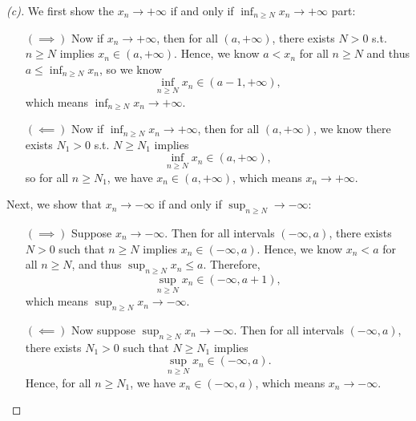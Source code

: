 \begin{proof}[(c)]
  We first show the \(x_n \to +\infty \) if and only if \(\inf _{n \ge N} x_n \to +\infty \) part: 
  \begin{itemize}
    \item [\((\implies )\)] Now if \(x_n \to +\infty \), then for all \((a, +\infty )\), there exists \(N > 0\) s.t. \(n \ge N\) implies \(x_n \in (a, +\infty )\). Hence, we know \(a < x_n\) for all \(n \ge N\) and thus \(a \le \inf _{n \ge N} x_n\), so we know \[\inf _{n \ge N}x_n \in (a - 1, +\infty ),\] which means \(\inf _{n \ge N} x_n \to +\infty \).          
    \item [\((\impliedby )\)] Now if \(\inf _{n \ge N} x_n \to +\infty \), then for all \((a, +\infty )\), we know there exists \(N_1 > 0\) s.t. \(N \ge N_1\) implies 
    \[
      \inf _{n \ge N} x_n \in (a, +\infty ),
    \] so for all \(n \ge N_1\), we have \(x_n \in (a, +\infty )\), which means \(x_n \to +\infty \).   
  \end{itemize}
  Next, we show that \(x_n \to -\infty \) if and only if \(\sup _{n \ge N} \to -\infty \):
  
\begin{itemize}
  \item [\((\implies)\)] 
  Suppose \(x_n \to -\infty\).  
  Then for all intervals \((-\infty, a)\), there exists \(N > 0\) such that \(n \ge N\) implies \(x_n \in (-\infty, a)\).  
  Hence, we know \(x_n < a\) for all \(n \ge N\), and thus \(\sup_{n \ge N} x_n \le a\).  
  Therefore, 
  \[
    \sup_{n \ge N} x_n \in (-\infty, a + 1),
  \]
  which means \(\sup_{n \ge N} x_n \to -\infty\).
  
  \item [\((\impliedby)\)] 
  Now suppose \(\sup_{n \ge N} x_n \to -\infty\).  
  Then for all intervals \((-\infty, a)\), there exists \(N_1 > 0\) such that \(N \ge N_1\) implies
  \[
    \sup_{n \ge N} x_n \in (-\infty, a).
  \]
  Hence, for all \(n \ge N_1\), we have \(x_n \in (-\infty, a)\), which means \(x_n \to -\infty\).
\end{itemize}  
\end{proof}
